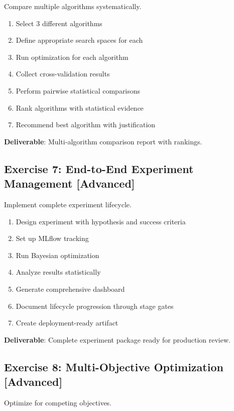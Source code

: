 Compare multiple algorithms systematically.

\begin{enumerate}
    \item Select 3 different algorithms
    \item Define appropriate search spaces for each
    \item Run optimization for each algorithm
    \item Collect cross-validation results
    \item Perform pairwise statistical comparisons
    \item Rank algorithms with statistical evidence
    \item Recommend best algorithm with justification
\end{enumerate}

\textbf{Deliverable}: Multi-algorithm comparison report with rankings.

\subsection{Exercise 7: End-to-End Experiment Management [Advanced]}

Implement complete experiment lifecycle.

\begin{enumerate}
    \item Design experiment with hypothesis and success criteria
    \item Set up MLflow tracking
    \item Run Bayesian optimization
    \item Analyze results statistically
    \item Generate comprehensive dashboard
    \item Document lifecycle progression through stage gates
    \item Create deployment-ready artifact
\end{enumerate}

\textbf{Deliverable}: Complete experiment package ready for production review.

\subsection{Exercise 8: Multi-Objective Optimization [Advanced]}

Optimize for competing objectives.


